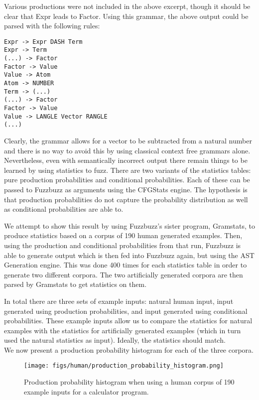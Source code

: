 Various productions were not included in the above excerpt, though it should be
clear that Expr leads to Factor. Using this grammar, the above output could
be parsed with the following rules:

\begin{verbatim}
Expr -> Expr DASH Term
Expr -> Term
(...) -> Factor
Factor -> Value
Value -> Atom
Atom -> NUMBER
Term -> (...)
(...) -> Factor
Factor -> Value
Value -> LANGLE Vector RANGLE
(...)
\end{verbatim}

Clearly, the grammar allows for a vector to be subtracted from a natural number
and there is no way to avoid this by using classical context free grammars
alone. \\


Nevertheless, even with semantically incorrect output there remain things
to be learned by using statistics to fuzz. There are two variants of the
statistics tables: pure production probabilities and conditional probabilities.
Each of these can be passed to Fuzzbuzz as arguments using the CFGStats engine.
The hypothesis is that production probabilities do not capture the probability
distribution as well as conditional probabilities are able to.

We attempt to show this result by using Fuzzbuzz's sister program, Gramstats,
to produce statistics based on a corpus of 190 human generated examples. Then,
using the production and conditional probabilities from that run, Fuzzbuzz is
able to generate output which is then fed into Fuzzbuzz again, but using the AST
Generation engine. This was done 400 times for each statistics table in order to
generate two different corpora. The two artificially generated corpora are then
parsed by Gramstats to get statistics on them.

In total there are three sets of example inputs: natural human input, input
generated using production probabilities, and input generated using conditional
probabilities. These example inputs allow us to compare the statistics for
natural examples with the statistics for artificially generated examples (which
in turn used the natural statistics as input). Ideally, the statistics should
match. \\

\noindent We now present a production probability histogram for each of the
three corpora. \\

\begin{figure*}
    \begin{center}

\texttt{[image: figs/human/production\_probability\_histogram.png]}
    \end{center}
        \caption{Production probability histogram when using a human corpus of
190 example inputs for a calculator program.}
    \label{times}
\end{figure*}

